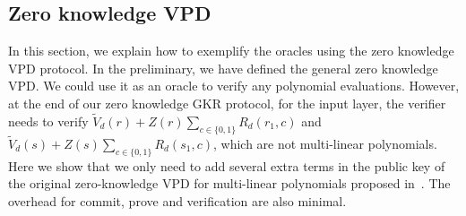 \subsection{Zero knowledge VPD}
In this section, we explain how to exemplify the oracles using the zero knowledge VPD protocol. In the preliminary, we have defined the general zero knowledge VPD. We could use it as an oracle to verify any polynomial evaluations. However, at the end of our zero knowledge GKR protocol, for the input layer, the verifier needs to verify $\tilde{V}_d(r) + Z(r)\sum\limits_{c \in \{0, 1\}}R_d(r_1, c)$ and $\tilde{V}_d(s) + Z(s)\sum\limits_{c \in \{0, 1\}}R_d(s_1, c)$, which are not multi-linear polynomials. Here we show that we only need to add several extra terms in the public key of the original zero-knowledge VPD for multi-linear polynomials proposed in~\cite{zkvpd}. The overhead for commit, prove and verification are also minimal.

